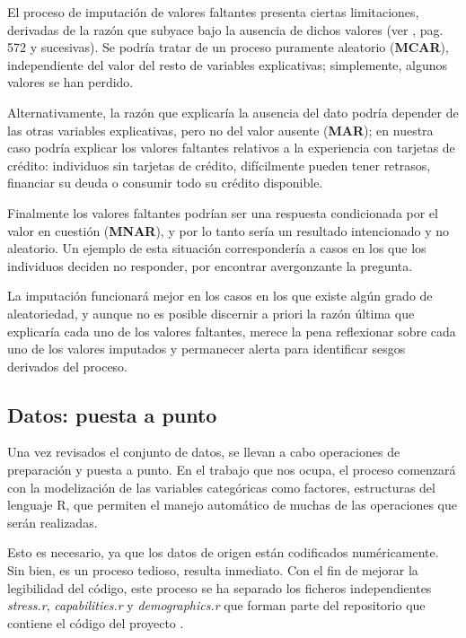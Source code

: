 \documentclass[a4paper, 11pt]{article}
\begin{document}
El proceso de imputación de valores faltantes presenta ciertas limitaciones, derivadas de la
razón que subyace bajo la ausencia de dichos valores (ver \cite{lantz23}, pag. 572 y sucesivas). Se podría tratar de un proceso puramente aleatorio (\textbf{MCAR}), independiente 
del valor del resto de variables explicativas; simplemente, algunos valores se han perdido. 

Alternativamente, la razón que explicaría la ausencia del dato podría depender de las otras 
variables explicativas, pero no del valor ausente (\textbf{MAR}); en nuestra caso podría 
explicar los valores faltantes relativos a la experiencia con tarjetas de crédito: 
individuos sin tarjetas de crédito, difícilmente pueden tener retrasos, financiar su deuda o 
consumir todo su crédito disponible.

Finalmente los valores faltantes podrían ser una respuesta condicionada por el valor en cuestión (\textbf{MNAR}), y por lo tanto sería un resultado intencionado y no aleatorio. Un ejemplo de 
esta situación correspondería a casos en los que los individuos deciden no responder, por 
encontrar avergonzante la pregunta.

La imputación funcionará mejor en los casos en los que existe algún grado de aleatoriedad, y aunque no es posible discernir a priori la razón última que explicaría 
cada uno de los valores faltantes, merece la pena reflexionar sobre cada uno de los valores
imputados y permanecer alerta para identificar sesgos derivados del proceso.

\subsection{Datos: puesta a punto}
\label{sec:data_grooming}
Una vez revisados el conjunto de datos, se llevan a cabo operaciones de preparación y
puesta a punto. En el trabajo que nos ocupa, el proceso comenzará con la modelización
de las variables categóricas como factores, estructuras del lenguaje R, que permiten
el manejo automático de muchas de las operaciones que serán realizadas. 

Esto es necesario, ya que los datos de origen están codificados numéricamente. Sin bien, es un proceso tedioso, resulta inmediato. Con el fin de mejorar la legibilidad del código, este proceso se ha separado los ficheros independientes \textit{stress.r},
\textit{capabilities.r} y \textit{demographics.r} que forman parte del repositorio
que contiene el código del proyecto \cite{ALMO25}.
\end{document}
